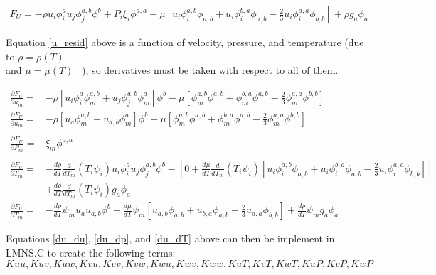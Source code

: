 \begin{align}
    F_U =  -\rho u_i \phi_i^a u_j \phi_j^{a,b} \phi^b + P_i \xi_i \phi^{a,a} - \mu \left [u_i \phi_i^{a,b} \phi_{a,b} + u_i \phi_i^{b,a} \phi_{a,b} - \frac{2}{3} u_i \phi_i^{a,a} \phi_{b,b} \right ] + \rho g_a \phi_a \label{u_resid}
\end{align}

Equation \ref{u_resid} above is a function of velocity, pressure, and temperature (due to $\rho = \rho(T)$ \\and $\mu = \mu(T)$ \ ), so derivatives must be taken with respect to all of them.

\begin{align}
   \frac{\partial F_U}{\partial u_m} = &-\rho \left [ u_i \phi_i^a \phi_m^{a,b} + u_j \phi_j^{a,b} \phi_m^a \right ] \phi^b 
        - \mu \left [\phi_m^{a,b} \phi^{a,b} + \phi_m^{b,a} \phi^{a,b} - \frac{2}{3} \phi_m^{a,a} \phi^{b,b} \right ] \nonumber \\     
   \frac{\partial F_U}{\partial u_m} = &-\rho \left [ u_a \phi_m^{a,b} + u_{a,b} \phi_m^a \right ] \phi^b - \mu \left [\phi_m^{a,b} \phi^{a,b} + \phi_m^{b,a} \phi^{a,b} - \frac{2}{3} \phi_m^{a,a} \phi^{b,b} \right ] \label{du_du}\\
   \nonumber \\ 
   \frac{\partial F_U}{\partial P_m} = &\xi_m \phi^{a,a} \label{du_dp} \\
   \nonumber \\
   \frac{\partial F_U}{\partial T_m} = &-\frac{d\rho}{dT} \frac{d}{dT_m}(T_i \psi_i) u_i \phi_i^a u_j \phi_j^{a,b} \phi^b
        - \left[ 0 + \frac{d\mu}{dT} \frac{d}{dT_m}(T_i \psi_i) [u_i \phi_i^{a,b} \phi_{a,b} + u_i \phi_i^{b,a} \phi_{a,b} - \frac{2}{3} u_i \phi_i^{a,a} \phi_{b,b} ] \right ] \nonumber
        \\ &+ \frac{d\rho}{dT} \frac{d}{dT_m}(T_i \psi_i) g_a \phi_a \nonumber \\       
   \frac{\partial F_U}{\partial T_m} = &-\frac{d\rho}{dT} \psi_m u_a u_{a,b} \phi^b
        - \frac{d\mu}{dT} \psi_m \left [u_{a,b} \phi_{a,b} + u_{b,a} \phi_{a,b} - \frac{2}{3} u_{a,a} \phi_{b,b} \right ]
        + \frac{d\rho}{dT} \psi_m g_a \phi_a \label{du_dT} 
\end{align}

Equations \ref{du_du}, \ref{du_dp}, and \ref{du_dT} above can then be implement in LMNS.C to create the following terms:\\
$Kuu, Kuv, Kuw, Kvu, Kvv, Kvw, Kwu, Kwv, Kww, KuT, KvT, KwT, KuP, KvP, KwP$

